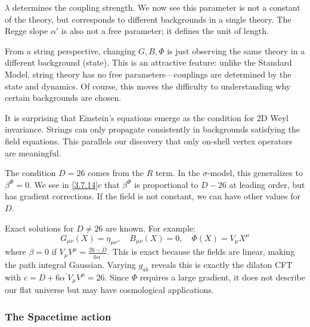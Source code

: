 $\lambda$ determines the coupling strength. We now see this parameter is not a constant of the theory, but corresponds to different backgrounds in a single theory. The Regge slope $\alpha'$ is also not a free parameter; it defines the unit of length.

From a string perspective, changing $G, B, \Phi$ is just observing the same theory in a different background (state). This is an attractive feature: unlike the Standard Model, string theory has no free parameters—couplings are determined by the state and dynamics. Of course, this moves the difficulty to understanding why certain backgrounds are chosen.

It is surprising that Einstein's equations emerge as the condition for 2D Weyl invariance. Strings can only propagate consistently in backgrounds satisfying the field equations. This parallels our discovery that only on-shell vertex operators are meaningful.

The condition $D=26$ comes from the $R$ term. In the $\sigma$-model, this generalizes to $\beta^\Phi = 0$. We see in \eqref{3.7.14}c that $\beta^\Phi$ is proportional to $D-26$ at leading order, but has gradient corrections. If the field is not constant, we can have other values for $D$.

Exact solutions for $D \neq 26$ are known. For example:
\begin{equation}\label{3.7.18}
	G_{\mu \nu}(X)=\eta_{\mu \nu}, \quad B_{\mu \nu}(X)=0, \quad \Phi(X)=V_{\mu} X^{\mu}
\end{equation}
where $\beta=0$ if $V_{\mu} V^{\mu}=\frac{26-D}{6 \alpha^{\prime}}$. This is exact because the fields are linear, making the path integral Gaussian. Varying $g_{ab}$ reveals this is exactly the dilaton CFT with $c=D+6 \alpha^{\prime} V_{\mu} V^{\mu}=26$. Since $\Phi$ requires a large gradient, it does not describe our flat universe but may have cosmological applications.

\subsubsection*{\Large The Spacetime action}

